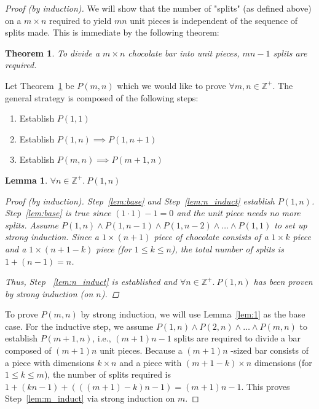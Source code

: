 \documentclass[a4paper]{article}
\newenvironment{subproof}[1][\proofname]{%
  \renewcommand{\qedsymbol}{$\blacksquare$}%
  \begin{proof}[#1]%
}{%
  \end{proof}%
}
\newtheorem{theorem}{Theorem}[section]
\newtheorem{lemma}{Lemma}[section]
\begin{document}
	\begin{proof}[Proof (by induction)]
		We will show that the number of "splits" (as defined above) on a $m \times
		n$ required to yield $mn$ unit pieces is independent of the sequence of
		splits made. This is immediate by the following theorem:

		\begin{theorem}
			\label{thm:P(m,n)}
			To divide a $m \times n$ chocolate bar into unit pieces, $mn - 1$ splits are required.
		\end{theorem}

		Let Theorem~\ref{thm:P(m,n)} be $P(m,n)$ which we would like to prove
		$\forall m, n \in \mathbb{Z}^{+}$. The general strategy is composed of the
		following steps:

		\begin{enumerate}
			\item \label{lem:base} Establish $P(1, 1)$
			\item \label{lem:n_induct} Establish $P(1, n) \implies P(1, n + 1)$
			\item \label{lem:m_induct} Establish $P(m, n) \implies P(m + 1, n)$
		\end{enumerate}

		\begin{lemma} $\forall n \in \mathbb{Z}^{+}.\ P(1, n)$
			\begin{subproof}[Proof (by induction)] \label{lem:1}
				Step~\ref{lem:base} and Step~\ref{lem:n_induct}
				establish $P(1, n)$.  Step~\ref{lem:base} is
				true since $(1 \cdot 1) - 1 = 0$ and the unit
				piece needs no more splits. Assume $P(1, n)
				\land P(1, n - 1) \land P(1, n - 2) \land
				\ldots \land P(1, 1)$ to set up strong
				induction. Since a $1 \times (n+1)$ piece of
				chocolate consists of a $1 \times k$ piece and
				a $1 \times (n + 1 - k)$ piece (for $1 \leq k
				\leq n$), the total number of splits is $1 + (n
				- 1) = n$.

				Thus, Step ~\ref{lem:n_induct}
				is established and $\forall n \in \mathbb{Z}^{+}.\ P(1, n)$ has been proven
				by strong induction (on $n$).
			\end{subproof}
		\end{lemma}

		To prove $P(m,n)$ by strong induction, we will use
		Lemma~\ref{lem:1} as the base case. For the inductive step, we
		assume $P(1, n) \land P(2, n) \land \ldots \land P(m,n)$ to
		establish $P(m+1,n)$, i.e., $(m+1)n - 1$ splits are required to
		divide a bar composed of $(m+1)n$ unit pieces. Because a
		$(m+1)n$ -sized bar consists of a piece with dimensions $k
		\times n$ and a piece with $(m + 1 - k) \times n$ dimensions
		(for $1 \leq k \leq m$), the number of splits required is $1 +
		(kn-1) + (((m + 1) - k)n - 1) = (m+1)n -  1$.  This proves
		Step~\ref{lem:m_induct} via strong induction on $m$.

	\end{proof}
\end{document}
